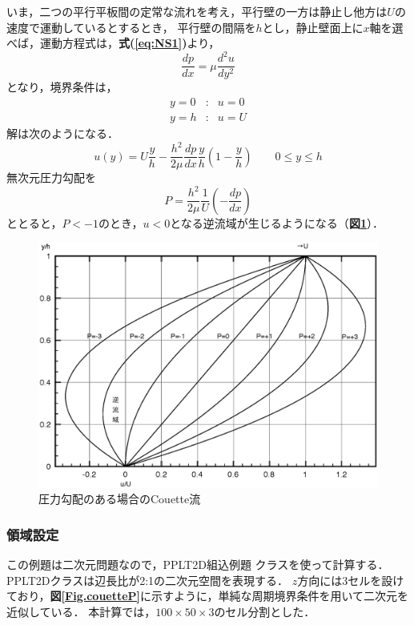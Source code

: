 いま，二つの平行平板間の定常な流れを考え，平行壁の一方は静止し他方は$U$の速度で運動しているとするとき，
平行壁の間隔を$h$とし，静止壁面上に$x$軸を選べば，運動方程式は，\textbf{式(\ref{eq:NS1})}より，
\begin{equation}
\frac{dp}{dx}=\mu\frac{d^2u}{dy^2}
\label{eq:motion}
\end{equation}
となり，境界条件は，
\begin{equation}
\begin{array}{lll}
y=0 & : & u=0 \\
y=h & : & u=U
\end{array}
\end{equation}
解は次のようになる．
\begin{equation}
u(y)=U\frac{y}{h}-\frac{h^2}{2\mu}\frac{dp}{dx}\frac{y}{h}
\left(1-\frac{y}{h}\right)
\mbox{　　}0\leq y\leq h
\end{equation}
無次元圧力勾配を
\begin{equation}
P = \frac{h^2}{2\mu}\frac{1}{U}\left(-\frac{dp}{dx}\right)
\label{eq:P}
\end{equation}
ととると，$P<-1$のとき，$u<0$となる逆流域が生じるようになる（\textbf{図\ref{Fig.couetteG}}）．

\begin{figure}[htbp]
\centering
\includegraphics[width=12cm]{exact_solution.eps}
\caption{圧力勾配のある場合のCouette流}
\label{Fig.couetteG}
\end{figure}

\subsubsection{領域設定}
この例題は二次元問題なので，PPLT2D組込例題
クラスを使って計算する．
PPLT2Dクラスは辺長比が2:1の二次元空間を表現する．
$z$方向には3セルを設けており，\textbf{図\ref{Fig.couetteP}}に示すように，単純な周期境界条件を用いて二次元を近似している．
本計算では，$100\times50\times3$のセル分割とした．

